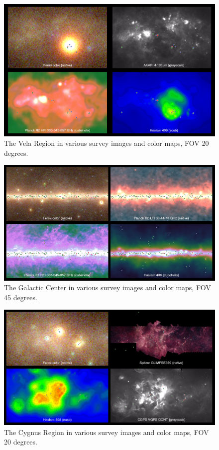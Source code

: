 \begin{figure}[h]
  \centerline{\includegraphics[width=\textwidth]{figures/vela_region}}
  \caption{The Vela Region in various survey images and color maps, FOV 20 degrees.}
\end{figure}

\begin{figure}[h]
  \centerline{\includegraphics[width=\textwidth]{figures/galactic_region}}
  \caption{The Galactic Center in various survey images and color maps, FOV 45 degrees.}
\end{figure}

\begin{figure}[h]
  \centerline{\includegraphics[width=\textwidth]{figures/cygnus_region}}
  \caption{The Cygnus Region in various survey images and color maps, FOV 20 degrees.}
\end{figure}

